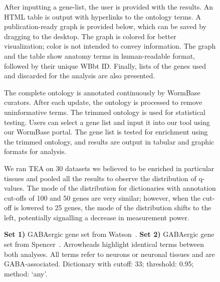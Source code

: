 \documentclass{bmcart}
\begin{document}
\begin{backmatter}
\begin{figure}[htbp]
	\centering
  	\captionsetup{width= 0.95\textwidth}
 	\caption{
	After inputting a gene-list, the user is provided with the results. An HTML table is output with hyperlinks to the ontology terms. A publication-ready graph is provided below, which can be saved by  dragging to the desktop. The graph is colored for better visualization; color is not intended to convey information. The graph and the table show anatomy terms in  human-readable format, followed by their unique WBbt ID. Finally, lists  of the genes used and discarded for the analysis are also presented.
  }
  \label{fig:GUIresults}
\end{figure}


\begin{figure}[htbp]
	\centering
	\captionsetup{width= 0.95\textwidth}
	\caption{
	The complete ontology is annotated continuously by WormBase curators. After each update, the ontology is processed to remove uninformative terms. The trimmed ontology is used for statistical testing. 
	Users can select a gene list and input it into our tool using our WormBase portal. The gene list is tested for enrichment using the trimmed ontology, and results are output in tabular and graphic formats for analysis. 
	}
	\label{fig:workflow}
\end{figure}


\begin{figure}[htbp]
  \captionsetup{width= 0.95\textwidth}
  \caption{
      We ran TEA on 30 datasets we believed to be enriched in particular tissues and pooled all the results to observe the distribution of q-values. The mode of the distribution for dictionaries with annotation cut-offs of 100 and 50 genes are very similar; however, when the cut-off is lowered to 25 genes, the mode of the distribution shifts to the left, potentially signalling a decrease in measurement power.
	  }
	  \label{fig:qvals}
\end{figure}



\begin{figure}
  \captionsetup{width= 0.95\textwidth}
  \caption{
  \textbf{Set 1)} GABAergic gene set from Watson~\cite{Watson2008a}.
  \textbf{Set 2)} GABAergic gene set from Spencer~\cite{Spencer2011}.
  Arrowheads highlight identical terms between both analyses. All terms refer to neurons or neuronal tissues and are GABA-associated. Dictionary with cutoff: 33; threshold: 0.95; method: `any'.
   }
  \label{fig:intragree}
\end{figure}



\end{backmatter}
\end{document}
